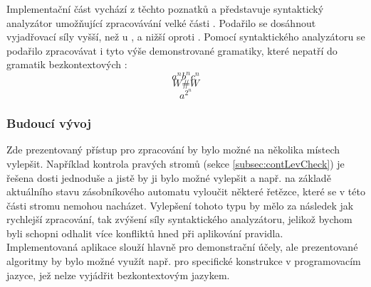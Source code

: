 Implementační část vychází z těchto poznatků a představuje syntaktický analyzátor
umožňující zpracovávání velké části . Podařilo se
dosáhnout vyjadřovací síly vyšší, než u ,
a nižší oproti .
Pomocí syntaktického analyzátoru se podařilo zpracovávat i tyto
výše demonstrované gramatiky, které nepatří do gramatik
bezkontextových \cite[str. 29]{Koutny}:
\[ a^nb^nc^n \]
\[ W\#W \]
\[ a^{2^n} \]
\subsubsection*{Budoucí vývoj}

Zde prezentovaný přístup pro zpracování  by
bylo možné na několika místech vylepšit. Například kontrola pravých stromů
(sekce \ref{subsec:contLevCheck}) je řešena dosti jednoduše a jistě by ji bylo možné
vylepšit a např. na základě aktuálního stavu zásobníkového automatu vyloučit některé
řetězce, které se v této části stromu nemohou nacházet.
Vylepšení tohoto typu by mělo za následek jak rychlejší zpracování, tak zvýšení síly
syntaktického analyzátoru, jelikož bychom byli schopni odhalit více konfliktů
hned při aplikování pravidla.\\

Implementovaná aplikace slouží hlavně pro demonstrační účely, ale prezentované
algoritmy by bylo možné využít např. pro specifické konstrukce v programovacím
jazyce, jež nelze vyjádřit bezkontextovým jazykem.

